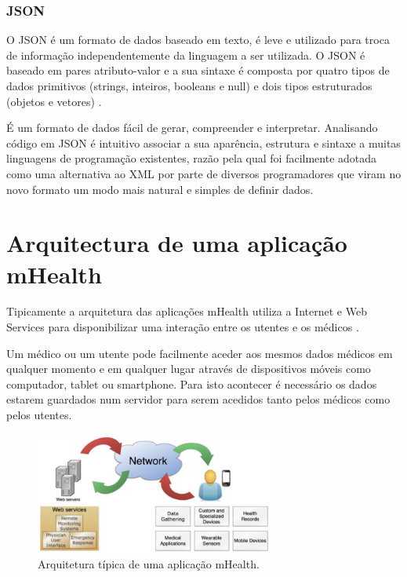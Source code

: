 \subsubsection{JSON}

O \gls{JSON} é um formato de dados baseado em texto, é leve e utilizado para troca de informação independentemente da linguagem a ser utilizada. O \gls{JSON} é baseado em pares atributo-valor e a sua sintaxe é composta por quatro tipos de dados primitivos (strings, inteiros, booleans e null) e dois tipos estruturados (objetos e vetores) \cite{json}. 
\par
É um formato de dados  fácil de gerar, compreender e interpretar. Analisando código em \gls{JSON} é intuitivo associar a sua aparência, estrutura e sintaxe a muitas linguagens de programação existentes, razão pela qual foi facilmente adotada como uma alternativa ao \gls{XML} por parte de diversos programadores que viram no novo formato um modo mais natural e simples de definir dados.

\section{Arquitectura de uma aplica\c c\~ao mHealth}

Tipicamente a arquitetura das aplica\c c\~oes mHealth utiliza a Internet e Web Services para disponibilizar uma intera\c c\~ao entre os utentes e os m\'edicos \cite{mhealth}.
\par
Um m\'edico ou um utente pode facilmente aceder aos mesmos dados m\'edicos em qualquer momento e em qualquer lugar atrav\'es de dispositivos m\'oveis como computador, tablet ou smartphone. Para isto acontecer é necessário os dados estarem guardados num servidor para serem acedidos tanto pelos médicos como pelos utentes.

\begin{figure}[H]
  \centering
  \includegraphics[width=0.7\textwidth]{imgs/mHealthArch.png}
  \caption[Arquitetura t\'ipica de uma  aplica\c c\~ao mHealth]{Arquitetura t\'ipica de uma  aplica\c c\~ao mHealth. \cite{mhealth}}
  
  \label{f:mhealtharch}
\end{figure}


